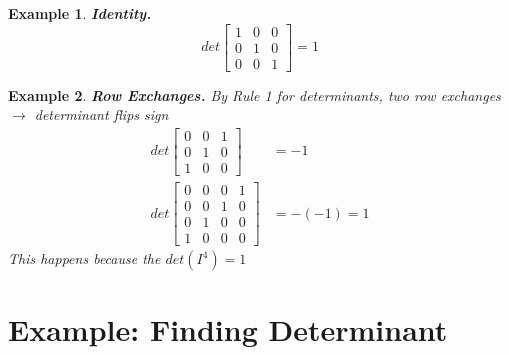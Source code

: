 \documentclass[12pt]{amsart}
\newtheorem{example}{Example}      %
\numberwithin{equation}{theorem}    %
\begin{document}
\begin{example}\textbf{Identity.}
    \begin{equation*}
        det \begin{bmatrix}
            1 & 0 & 0 \\
            0 & 1 & 0 \\
            0 & 0 & 1
        \end{bmatrix} = 1
    \end{equation*}
\end{example}

\begin{example}\textbf{Row Exchanges.}
    By Rule 1 for determinants, two row exchanges $\rightarrow$ determinant flips sign
    \begin{align*}
        det \begin{bmatrix}
            0 & 0 & 1 \\
            0 & 1 & 0 \\
            1 & 0 & 0
        \end{bmatrix} & = -1        \\
        det \begin{bmatrix}
            0 & 0 & 0 & 1 \\
            0 & 0 & 1 & 0 \\
            0 & 1 & 0 & 0 \\
            1 & 0 & 0 & 0
        \end{bmatrix} & = -(-1) = 1
    \end{align*}
    This happens because the $det(I^{4}) = 1$
\end{example}

\section{Example: Finding Determinant}
\end{document}
